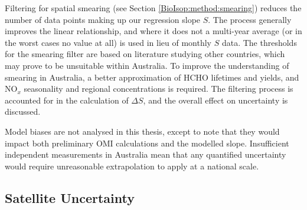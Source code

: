     
    Filtering for spatial smearing (see Section \ref{BioIsop:method:smearing}) reduces the number of data points making up our regression slope $S$. 
    The process generally improves the linear relationship, and where it does not a multi-year average (or in the worst cases no value at all) is used in lieu of monthly $S$ data.
    The thresholds for the smearing filter are based on literature studying other countries, which may prove to be unsuitable within Australia.
    To improve the understanding of smearing in Australia, a better approximation of HCHO lifetimes and yields, and NO$_x$ seasonality and regional concentrations is required.
    The filtering process is accounted for in the calculation of $\Delta S$, and the overall effect on uncertainty is discussed.
    
    
    Model biases are not analysed in this thesis, except to note that they would impact both preliminary OMI calculations and the modelled slope. 
    Insufficient independent measurements in Australia mean that any quantified uncertainty would require unreasonable extrapolation to apply at a national scale.
    
    
  \subsection{Satellite Uncertainty}
    \label{BioIsop:uncertainty:satellite}
    

